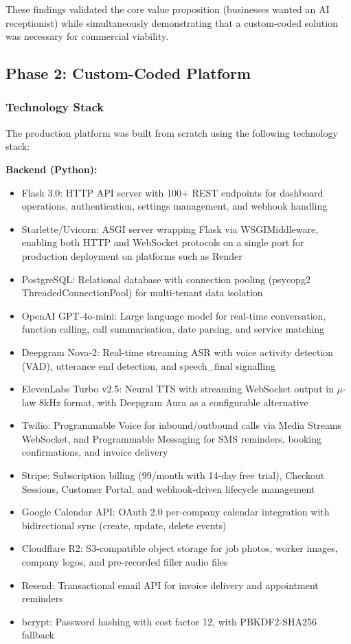 \documentclass[conference]{IEEEtran}
\begin{document}
These findings validated the core value proposition (businesses wanted an AI receptionist) while simultaneously demonstrating that a custom-coded solution was necessary for commercial viability.

\subsection{Phase 2: Custom-Coded Platform}

\subsubsection{Technology Stack}

The production platform was built from scratch using the following technology stack:

\textbf{Backend (Python):}
\begin{itemize}
\item Flask 3.0: HTTP API server with 100+ REST endpoints for dashboard operations, authentication, settings management, and webhook handling
\item Starlette/Uvicorn: ASGI server wrapping Flask via WSGIMiddleware, enabling both HTTP and WebSocket protocols on a single port for production deployment on platforms such as Render
\item PostgreSQL: Relational database with connection pooling (psycopg2 ThreadedConnectionPool) for multi-tenant data isolation
\item OpenAI GPT-4o-mini: Large language model for real-time conversation, function calling, call summarisation, date parsing, and service matching
\item Deepgram Nova-2: Real-time streaming ASR with voice activity detection (VAD), utterance end detection, and speech\_final signalling
\item ElevenLabs Turbo v2.5: Neural TTS with streaming WebSocket output in $\mu$-law 8kHz format, with Deepgram Aura as a configurable alternative
\item Twilio: Programmable Voice for inbound/outbound calls via Media Streams WebSocket, and Programmable Messaging for SMS reminders, booking confirmations, and invoice delivery
\item Stripe: Subscription billing (\texteuro{}99/month with 14-day free trial), Checkout Sessions, Customer Portal, and webhook-driven lifecycle management
\item Google Calendar API: OAuth 2.0 per-company calendar integration with bidirectional sync (create, update, delete events)
\item Cloudflare R2: S3-compatible object storage for job photos, worker images, company logos, and pre-recorded filler audio files
\item Resend: Transactional email API for invoice delivery and appointment reminders
\item bcrypt: Password hashing with cost factor 12, with PBKDF2-SHA256 fallback
\end{itemize}
\end{document}
